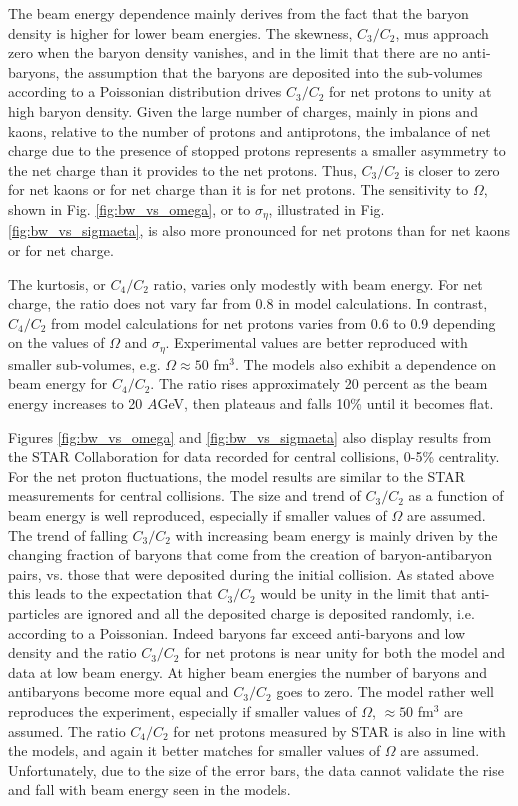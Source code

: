 The beam energy dependence mainly derives from the fact that the baryon density is higher for lower beam energies. The skewness, $C_3/C_2$, mus approach zero when the baryon density vanishes, and in the limit that there are no anti-baryons, the assumption that the baryons are deposited into the sub-volumes according to a Poissonian distribution drives $C_3/C_2$ for net protons to unity at high baryon density. Given the large number of charges, mainly in pions and kaons, relative to the number of protons and antiprotons, the imbalance of net charge due to the presence of stopped protons represents a smaller asymmetry to the net charge than it provides to the net protons. Thus, $C_3/C_2$ is closer to zero for net kaons or for net charge than it is for net protons. The sensitivity to $\Omega$, shown in Fig. \ref{fig:bw_vs_omega}, or to $\sigma_\eta$, illustrated in Fig. \ref{fig:bw_vs_sigmaeta}, is also more pronounced for net protons than for net kaons or for net charge.

The kurtosis, or $C_4/C_2$ ratio, varies only modestly with beam energy. For net charge, the ratio does not vary far from 0.8 in model calculations. In contrast, $C_4/C_2$ from model calculations for net protons varies from 0.6 to 0.9 depending on the values of $\Omega$ and $\sigma_\eta$. Experimental values are better reproduced with smaller sub-volumes, e.g. $\Omega\approx 50$ fm$^3$. The models also exhibit a dependence on beam energy for $C_4/C_2$. The ratio rises approximately 20 percent as the beam energy increases to 20 $A$GeV, then plateaus and falls 10\% until it becomes flat.

Figures \ref{fig:bw_vs_omega} and \ref{fig:bw_vs_sigmaeta} also display results from the STAR Collaboration for data recorded for central collisions, 0-5\% centrality. For the net proton fluctuations, the model results are similar to the STAR measurements for central collisions. The size and trend of $C_3/C_2$ as a function of beam energy is well reproduced, especially if smaller values of $\Omega$ are assumed. The trend of falling $C_3/C_2$ with increasing beam energy is mainly driven by the changing fraction of baryons that come from the creation of baryon-antibaryon pairs, vs. those that were deposited during the initial collision. As stated above this leads to the expectation that $C_3/C_2$ would be unity in the limit that anti-particles are ignored and all the deposited charge is deposited randomly, i.e. according to a Poissonian. Indeed baryons far exceed anti-baryons and low density and the ratio $C_3/C_2$ for net protons is near unity for both the model and data at low beam energy. At higher beam energies the number of baryons and antibaryons become more equal and $C_3/C_2$ goes to zero. The model rather well reproduces the experiment, especially if smaller values of $\Omega$, $\approx 50$ fm$^3$ are assumed. The ratio $C_4/C_2$ for net protons measured by STAR is also in line with the models, and again it better matches for smaller values of $\Omega$ are assumed. Unfortunately, due to the size of the error bars, the data cannot validate the rise and fall with beam energy seen in the models. 

